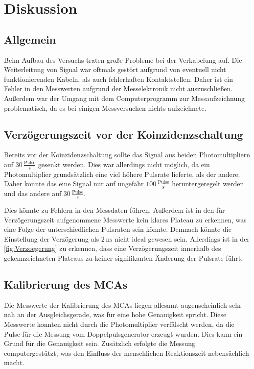 \section{Diskussion}
\label{sec:Diskussion}
\subsection{Allgemein}
Beim Aufbau des Versuchs traten große Probleme bei der Verkabelung auf. Die Weiterleitung von Signal war oftmals gestört aufgrund von eventuell
nicht funktionierenden Kabeln, als auch fehlerhaften Kontaktstellen. 
Daher ist ein Fehler in den Messwerten aufgrund der Messelektronik nicht auszuschließen. Außerdem war 
der Umgang mit dem Computerprogramm zur Messaufzeichnung problematisch, da es bei einigen Messversuchen nichts aufzeichnete. 

\subsection{Verzögerungszeit vor der Koinzidenzschaltung}
Bereits vor der Koinzidenzschaltung sollte das Signal aus beiden Photomultipliern auf $30 \,\frac{\text{Pulse}}{\unit{\second}}$ gesenkt 
werden. Dies war allerdings nicht möglich, da ein Photomultiplier grundsätzlich eine viel höhere Pulsrate lieferte, als der andere. 
Daher konnte das eine Signal nur auf ungefähr $100 \,\frac{\text{Pulse}}{\unit{\second}}$ heruntergeregelt werden und das andere 
auf $30 \,\frac{\text{Pulse}}{\unit{\second}}$. 

Dies könnte zu Fehlern in den Messdaten führen. 
Außerdem ist in den für 
Verzögerungszeit aufgenommene Messwerte kein klares Plateau zu erkennen, was eine Folge der unterschiedlichen Pulsraten sein könnte. 
Demnach könnte die Einstellung der Verzögerung als $2 \, \unit{\nano\second}$ nicht ideal gewesen sein. Allerdings ist in 
der \autoref{fig:Verzoegerung} zu erkennen, dass eine Verzögerungszeit innerhalb des gekennzeichneten Plateaus zu keiner signifikanten
Änderung der Pulsrate führt.

\subsection{Kalibrierung des MCAs}
Die Messwerte der Kalibrierung des MCAs liegen allesamt augenscheinlich sehr nah an der Ausgleichsgerade, was für eine hohe 
Genauigkeit spricht. 
Diese Messwerte konnten nicht durch die Photomultiplier verfälscht werden, da die Pulse für die Messung vom Doppelpulsgenerator erzeugt wurden. 
Dies kann ein Grund für die Genauigkeit sein.
Zusätzlich erfolgte die Messung computergestützt, was den Einfluss der menschlichen Reaktionszeit nebensächlich macht. 

